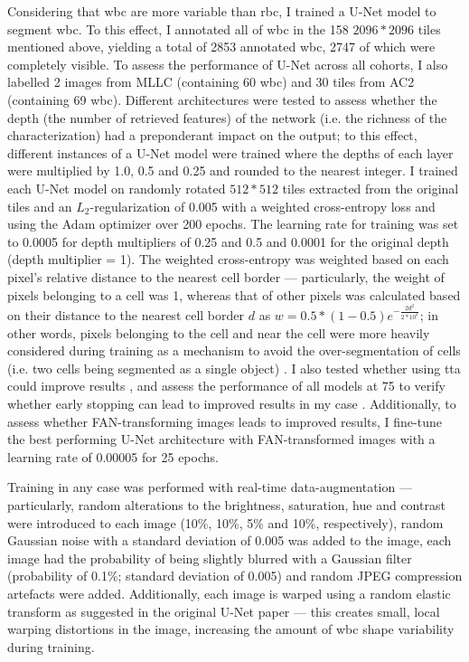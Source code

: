 Considering that \ac{wbc} are more variable than \ac{rbc}, I trained a U-Net model \cite{Ronneberger2015-do} to segment \ac{wbc}. To this effect, I annotated all of \ac{wbc} in the 158 $2096*2096$ tiles mentioned above, yielding a total of 2853 annotated \ac{wbc}, 2747 of which were completely visible. To assess the performance of U-Net across all cohorts, I also labelled 2 images from MLLC (containing 60 \ac{wbc}) and 30 tiles from AC2 (containing 69 \ac{wbc}). Different architectures were tested to assess whether the depth (the number of retrieved features) of the network (i.e. the richness of the characterization) had a preponderant impact on the output; to this effect, different instances of a U-Net model were trained where the depths of each layer were multiplied by 1.0, 0.5 and 0.25 and rounded to the nearest integer. I trained each U-Net model on randomly rotated $512*512$ tiles extracted from the original tiles and an $L_2$-regularization of 0.005 with a weighted cross-entropy loss and using the Adam optimizer \cite{Kingma2014-zd} over 200 epochs. The learning rate for training was set to 0.0005 for depth multipliers of 0.25 and 0.5 and 0.0001 for the original depth (depth multiplier = 1). The weighted cross-entropy was weighted based on each pixel's relative distance to the nearest cell border --- particularly, the weight of pixels belonging to a cell was 1, whereas that of other pixels was calculated based on their distance to the nearest cell border $d$ as $w = 0.5 * (1-0.5)e^{-\frac{2d^2}{2*10^2}}$; in other words, pixels belonging to the cell and near the cell were more heavily considered during training as a mechanism to avoid the over-segmentation of cells (i.e. two cells being segmented as a single object) \cite{Ronneberger2015-do}. I also tested whether using \ac{tta} could improve results \cite{Moshkov2020-rc}, and assess the performance of all models at 75 to verify whether early stopping can lead to improved results in my case \cite{Prechelt2012-xf}. Additionally, to assess whether FAN-transforming images leads to improved results, I fine-tune the best performing U-Net architecture with FAN-transformed images with a learning rate of 0.00005 for 25 epochs. 

Training in any case was performed with real-time data-augmentation --- particularly, random alterations to the brightness, saturation, hue and contrast were introduced to each image (10\%, 10\%, 5\% and 10\%, respectively), random Gaussian noise with a standard deviation of 0.005 was added to the image, each image had the probability of being slightly blurred with a Gaussian filter (probability of 0.1\%; standard deviation of 0.005) and random JPEG compression artefacts were added. Additionally, each image is warped using a random elastic transform as suggested in the original U-Net paper \cite{Ronneberger2015-do} --- this creates small, local warping distortions in the image, increasing the amount of \ac{wbc} shape variability during training. 


